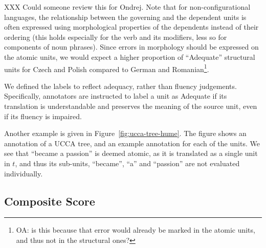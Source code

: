 \documentclass[11pt]{article}
\newcommand{\figref}[1]{Figure~\ref{#1}}
\newcommand{\XXX}[1]{{\color{red}XXX #1}} %
\newcommand{\oa}[1]{\footnote{\color{red}OA: #1}}
\begin{document}
\XXX{Could someone review this for Ondrej.}
Note that for non-configurational languages, the relationship between the
governing and the dependent units is often expressed using morphological
properties of the dependents instead of their ordering (this holds especially for the verb and its
modifiers, less so for components of noun phrases). Since errors in morphology
should be expressed on the atomic units, we would expect
a higher proportion of ``Adequate'' structural units for Czech and Polish
compared to German and Romanian\oa{is this because that error would already be marked
  in the atomic units, and thus not in the structural ones?}.

We defined the labels to reflect adequacy,
rather than fluency judgements. Specifically, annotators are instructed to
label a unit as Adequate if its translation is understandable and preserves
the meaning of the source unit, even if its fluency is impaired.


Another example is given in \figref{fig:ucca-tree-hume}.
The figure shows an annotation of a UCCA tree, and an example annotation for
each of the units.
We see that ``became a passion'' is deemed atomic, as it is translated as a single unit
in $t$, and thus its sub-units, ``became'', ``a'' and ``passion'' are not evaluated
individually.

\subsection{Composite Score}\label{sec:score}
\end{document}

